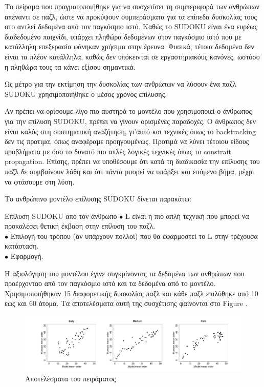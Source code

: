 \documentclass[12pt]{book}
\theoremstyle{definition}
\begin{document}
Το πείραμα που πραγματοποιήθηκε για να συσχετίσει τη συμπεριφορά των ανθρώπων απέναντι σε παζλ, ώστε να προκύψουν συμπεράσματα για τα επίπεδα δυσκολίας τους στο \cite{5} αντλεί δεδομένα από τον παγκόσμιο ιστό. Καθώς το SUDOKU είναι ένα ευρέως διαδεδομένο παιχνίδι, υπάρχει πληθώρα δεδομένων στον παγκόσμιο ιστό που με κατάλληλη επεξερασία φάνηκαν χρήσιμα στην έρευνα. Φυσικά, τέτοια δεδομένα δεν είναι τα πλέον κατάλληλα, καθώς δεν υπόκεινται σε εργαστηριακόυς κανόνες, ωστόσο η πληθώρα τους τα κάνει εξίσου σημαντικά. \par

Ως μέτρο για την εκτίμηση την δυσκολίας των ανθρώπων να λύσουν ένα παζλ SUDOKU χρησιμοποιήθηκε ο μέσος χρόνος επίλυσης.

Αν πρέπει να ορίσουμε λίγο πιο αυστηρά το μοντέλο που χρησιμοποιεί ο άνθρωπος για την επίλυση SUDOKU, πρέπει να γίνουν ορισμένες παραδοχές. Ο άνθρωπος δεν είναι καλός στη συστηματική αναζήτηση, γι'αυτό και τεχνικές όπως το backtracking δεν τις προτιμα, όπως αναφέραμε προηγουμένως. Προτιμά να λύνει τέτοιου είδους προβλήματα με όσο το δυνατό πιο απλές λογικές τεχνικές όπως το constrait propagation. Επίσης, πρέπει να υποθέσουμε ότι κατά τη διαδικασία την επίλυσης του παζλ δε συμβαίνουν λάθη και ότι πάντα μπορεί να υπάρξει και επόμενο βήμα, μέχρι να φτάσουμε στη λύση. \par 

Το ανθρώπινο μοντέλο επίλυσης SUDOKU δίνεται παρακάτω: 

\begin{mytheorem}{Επίλυση SUDOKU από τον άνθρωπο}{}
	\(\bullet\) L είναι η πιο απλή τεχνική που μπορεί να προκαλέσει θετική έκβαση στην επίλυση του παζλ. \\
	\(\bullet\) Επιλογή του τρόπου (αν υπάρχουν πολλοί) που θα εφαρμοστεί το L στην τρέχουσα κατάσταση. \\
	\(\bullet\) Εφαρμογή. \\
\end{mytheorem}

Η αξιολόγηση του μοντέλου έγινε συγκρίνοντας τα δεδομένα των ανθρώπων που προέρχονταο από τον παγκόσμιο ιστό και τα δεδομένα από το μοντέλο. Χρησιμοποιήθηκαν 15 διαφορετικής δυσκολίας παζλ και κάθε παζλ επιλύθηκε από 10 εως και 60 άτομα. Τα αποτελέσματα αυτή της συσχέτισης φαίνονται στο Figure . \par

\begin{figure}[h]
	\centering	
	\includegraphics[scale=0.4]{Figures/results.png}
	\caption{Αποτελέσματα του πειράματος \cite{5}}
\end{figure}
\end{document}
